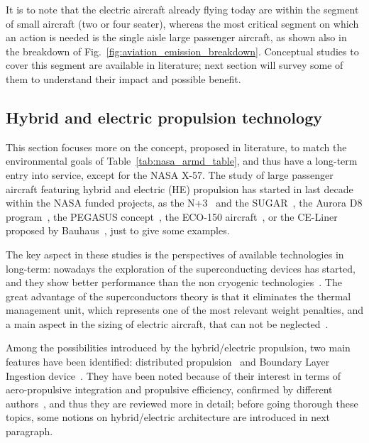 It is to note that the electric aircraft already flying today are within the segment of small aircraft (two or four seater), whereas the most critical segment on which an action is needed is the single aisle large passenger aircraft, as shown also in the breakdown of Fig.~\ref{fig:aviation_emission_breakdown}. 
Conceptual studies to cover this segment are available in literature; next section will survey some of them to understand their impact and possible benefit. 

\subsection{Hybrid and electric propulsion technology}
\label{subsec:chap1_he_aircraft_key_techno}

This section focuses more on the concept, proposed in literature, to match the environmental goals of Table~\ref{tab:nasa_armd_table}, and thus have a long-term entry into service, except for the NASA X-57.
The study of large passenger aircraft featuring hybrid and electric (HE) propulsion has started in last decade within the NASA funded projects, as the N+3~\cite{bib:follen_nasa_np3} and the SUGAR~\cite{bib:bradley_sugar_p2, bib:bradley_sugar_p2_v2}, the Aurora D8 program~\cite{bib:aurora_d8_ref}, the PEGASUS concept~\cite{bib:pegasus}, the ECO-150 aircraft~\cite{bib:schiltgen, bib:freeman_eco150}, or the CE-Liner proposed by Bauhaus~\cite{bib:hornung, bib:steiner}, just to give some examples. 

The key aspect in these studies is the perspectives of available technologies in long-term: nowadays the exploration of the superconducting devices has started, and they show better performance than the non cryogenic technologies~\cite{bib:dever, bib:madavan}. 
The great advantage of the superconductors theory is that it eliminates the thermal management unit, which represents one of the most relevant weight penalties, and a main aspect in the sizing of electric aircraft, that can not be neglected~\cite{bib:freeman}.

Among the possibilities introduced by the hybrid/electric propulsion, two main features have been identified: distributed propulsion~\cite{bib:gohardani_book} and Boundary Layer Ingestion device~\cite{bib:smith_bli}. 
They have been noted because of their interest in terms of aero-propulsive integration and propulsive efficiency, confirmed by different authors~\cite{bib:borer_sceptor, bib:welstead_2017}, and thus they are reviewed more in detail; before going thorough these topics, some notions on hybrid/electric architecture are introduced in next paragraph. 

